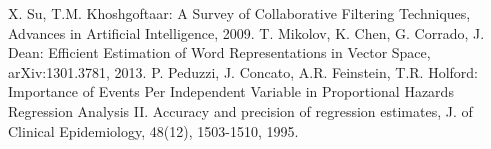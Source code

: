 {\footnotesize
\begin{thebibliography}{*}
 X. Su, T.M. Khoshgoftaar: A Survey of Collaborative Filtering Techniques, Advances in Artificial Intelligence, 2009.
 T. Mikolov, K. Chen, G. Corrado, J. Dean: Efficient Estimation of Word Representations in Vector Space, arXiv:1301.3781, 2013.
 P. Peduzzi, J. Concato, A.R. Feinstein, T.R. Holford:
Importance of Events Per Independent Variable in Proportional Hazards Regression Analysis II. Accuracy and precision of regression estimates, J. of Clinical Epidemiology, 48(12), 1503-1510, 1995.
\end{thebibliography}
}
